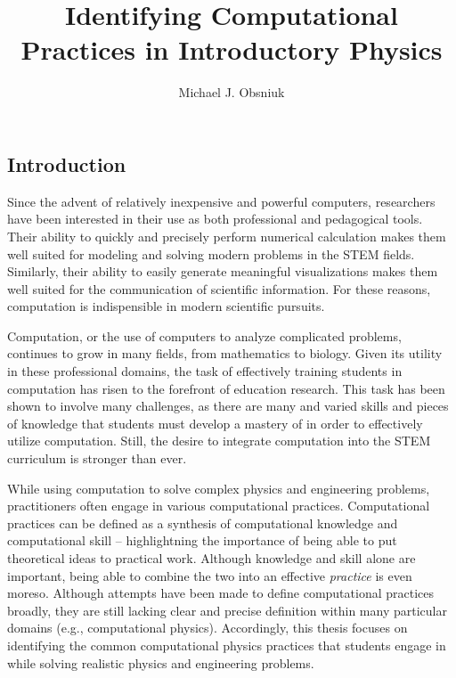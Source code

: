 \documentclass{msuphddissertation}
\author{Michael J. Obsniuk}
\title{Identifying Computational Practices in Introductory Physics}
\begin{document}
\maketitlepage

\begin{abstract}
\end{abstract}

\TOC
\LOT
\LOF

\newpage
{}
\begin{doublespace}

%
%

\chapter{Introduction}\label{CH1:Introduction}

Since the advent of relatively inexpensive and powerful computers, researchers have been interested in their use as both professional and pedagogical tools.  Their ability to quickly and precisely perform numerical calculation makes them well suited for modeling and solving modern problems in the STEM fields.  Similarly, their ability to easily generate meaningful visualizations makes them well suited for the communication of scientific information.  For these reasons, computation is indispensible in modern scientific pursuits.

Computation, or the use of computers to analyze complicated problems, continues to grow in many fields, from mathematics to biology.  Given its utility in these professional domains, the task of effectively training students in computation has risen to the forefront of education research.  This task has been shown to involve many challenges, as there are many and varied skills and pieces of knowledge that students must develop a mastery of in order to effectively utilize computation.  Still, the desire to integrate computation into the STEM curriculum is stronger than ever.

While using computation to solve complex physics and engineering problems, practitioners often engage in various computational practices.  Computational practices can be defined as a synthesis of computational knowledge and computational skill -- highlightning the importance of being able to put theoretical ideas to practical work.  Although knowledge and skill alone are important, being able to combine the two into an effective \textit{practice} is even moreso.  Although attempts have been made to define computational practices broadly, they are still lacking clear and precise definition within many particular domains (e.g., computational physics). Accordingly, this thesis focuses on identifying the common computational physics practices that students engage in while solving realistic physics and engineering problems.


\end{doublespace}
\end{document}
